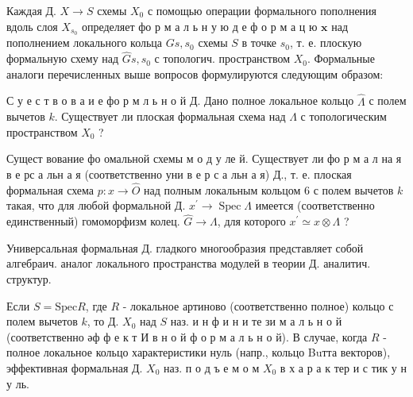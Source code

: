 \documentclass[10pt]{article}
\begin{document}
Каждая Д. $X \rightarrow S$ схемы $X_{0}$ с помощью операции формального пополнения вдоль слоя $X_{s_{0}}$ определяет фо р м а л ь н у ю д е ф о р м а ц ю $\boldsymbol{x}$ над пополнением локального кольца $G s, s_{0}$ схемы $S$ в точке $s_{0}$, т. е. плоскую формальную схему над $\widehat{G} s, s_{0}$ с топологич. пространством $X_{0}$. Формальные аналоги перечисленных выше вопросов формулируются следующим образом:



С у е с т в о в а и е фо р м л ь н о й Д. Дано полное локальное кольцо $\hat{\Lambda}$ с полем вычетов $k$. Существует ли плоская формальная схема над $\Lambda$ с топологическим пространством $X_{0}$ ?



Сущест вование фо омальной схемы м о д у ле й. Существует ли фо р м а л на я в е рс а льн а я (соответственно уни в е р с а льн а я) Д., т. е. плоская формальная схема $p: x \rightarrow \widehat{O}$ над полным локальным кольцом 6 с полем вычетов $k$ такая, что для любой формальной Д. $x^{\prime} \rightarrow \operatorname{Spec} \Lambda$ имеется (соответственно единственный) гомоморфизм колец. $\widehat{G} \rightarrow \Lambda$, для которого $x^{\prime} \simeq x \otimes \mathcal{} \Lambda$ ?



Универсальная формальная Д. гладкого многообразия представляет собой алгебраич. аналог локального пространства модулей в теории Д. аналитич. структур.



Если $S=\mathrm{Spec} R$, где $R$ - локальное артиново (соответственно полное) кольцо с полем вычетов $k$, то Д. $X_{0}$ над $S$ наз. и н ф и н и те зи м а л ь н о й (соответственно әф ф е к т И в н о й ф о р м а л ь н о й). В случае, когда $R$ - полное локальное кольцо характеристики нуль (напр., кольцо Buтта векторов), эффективная формальная Д. $X_{0}$ наз. п о д ъ е м о м $X_{0}$ в х а р а к тер и с тик у н у ль.
\end{document}

